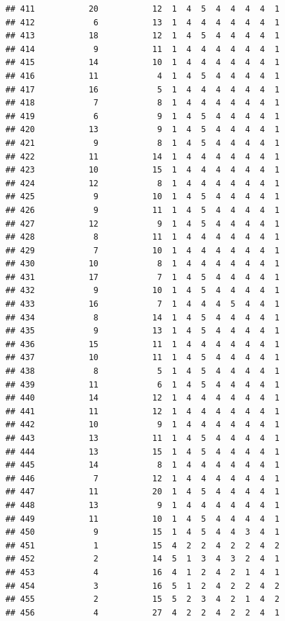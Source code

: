 \documentclass[12pt,]{krantz}
\theoremstyle{definition}
\theoremstyle{definition}
\theoremstyle{remark}
\begin{document}
\begin{verbatim}
## 411           20           12  1  4  5  4  4  4  4  1
## 412            6           13  1  4  4  4  4  4  4  1
## 413           18           12  1  4  5  4  4  4  4  1
## 414            9           11  1  4  4  4  4  4  4  1
## 415           14           10  1  4  4  4  4  4  4  1
## 416           11            4  1  4  5  4  4  4  4  1
## 417           16            5  1  4  4  4  4  4  4  1
## 418            7            8  1  4  4  4  4  4  4  1
## 419            6            9  1  4  5  4  4  4  4  1
## 420           13            9  1  4  5  4  4  4  4  1
## 421            9            8  1  4  5  4  4  4  4  1
## 422           11           14  1  4  4  4  4  4  4  1
## 423           10           15  1  4  4  4  4  4  4  1
## 424           12            8  1  4  4  4  4  4  4  1
## 425            9           10  1  4  5  4  4  4  4  1
## 426            9           11  1  4  5  4  4  4  4  1
## 427           12            9  1  4  5  4  4  4  4  1
## 428            8           11  1  4  4  4  4  4  4  1
## 429            7           10  1  4  4  4  4  4  4  1
## 430           10            8  1  4  4  4  4  4  4  1
## 431           17            7  1  4  5  4  4  4  4  1
## 432            9           10  1  4  5  4  4  4  4  1
## 433           16            7  1  4  4  4  5  4  4  1
## 434            8           14  1  4  5  4  4  4  4  1
## 435            9           13  1  4  5  4  4  4  4  1
## 436           15           11  1  4  4  4  4  4  4  1
## 437           10           11  1  4  5  4  4  4  4  1
## 438            8            5  1  4  5  4  4  4  4  1
## 439           11            6  1  4  5  4  4  4  4  1
## 440           14           12  1  4  4  4  4  4  4  1
## 441           11           12  1  4  4  4  4  4  4  1
## 442           10            9  1  4  4  4  4  4  4  1
## 443           13           11  1  4  5  4  4  4  4  1
## 444           13           15  1  4  5  4  4  4  4  1
## 445           14            8  1  4  4  4  4  4  4  1
## 446            7           12  1  4  4  4  4  4  4  1
## 447           11           20  1  4  5  4  4  4  4  1
## 448           13            9  1  4  4  4  4  4  4  1
## 449           11           10  1  4  5  4  4  4  4  1
## 450            9           15  1  4  5  4  4  3  4  1
## 451            1           15  4  2  2  4  2  2  4  2
## 452            2           14  5  1  3  4  3  2  4  1
## 453            4           16  4  1  2  4  2  1  4  1
## 454            3           16  5  1  2  4  2  2  4  2
## 455            2           15  5  2  3  4  2  1  4  2
## 456            4           27  4  2  2  4  2  2  4  1

\end{verbatim}
\end{document}

